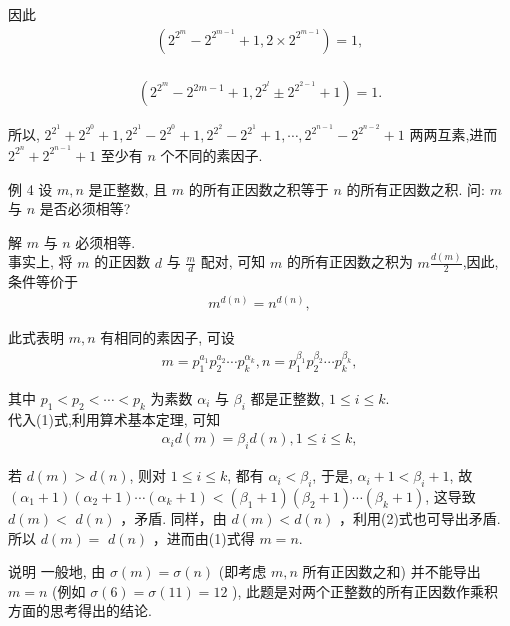 因此\\
\begin{align*}
\left(2^{2^{m}}-2^{2^{m-1}}+1,2 \times 2^{2^{m-1}}\right)=1,
\end{align*}\\
\begin{align*}
\left(2^{2^{m}}-2^{2 m-1}+1,2^{2^{l}} \pm 2^{2^{2-1}}+1\right)=1 .
\end{align*}

所以, $2^{2^{1}}+2^{2^{0}}+1,2^{2^{1}}-2^{2^{0}}+1,2^{2^{2}}-2^{2^{1}}+1, \cdots, 2^{2^{n-1}}-2^{2^{n-2}}+1$ 两两互素,进而 $2^{2^{n}}+2^{2^{n-1}}+1$ 至少有 $n$ 个不同的素因子. 

例 4 设 $m ,  n$ 是正整数, 且 $m$ 的所有正因数之积等于 $n$ 的所有正因数之积. 问: $m$ 与 $n$ 是否必须相等?

解 $m$ 与 $n$ 必须相等.\\
事实上, 将 $m$ 的正因数 $d$ 与 $\frac{m}{d}$ 配对, 可知 $m$ 的所有正因数之积为 $m \frac{d(m)}{2}$,因此, 条件等价于\\
\begin{align*}
m^{d(n)}=n^{d(n)},
\end{align*}

此式表明 $m ,  n$ 有相同的素因子, 可设\\
\begin{align*}
m=p_{1}^{a_{1}} p_{2}^{a_{2}} \cdots p_{k}^{\alpha_{k}}, n=p_{1}^{\beta_{1}} p_{2}^{\beta_{2}} \cdots p_{k}^{\beta_{k}},
\end{align*}

其中 $p_{1}<p_{2}<\cdots<p_{k}$ 为素数 $\alpha_{i}$ 与 $\beta_{i}$ 都是正整数, $1 \leqslant i \leqslant k$.\\
代入(1)式,利用算术基本定理, 可知\\
\begin{align*}
\alpha_{i} d(m)=\beta_{i} d(n), 1 \leqslant i \leqslant k,
\end{align*}

若 $d(m)>d(n)$, 则对 $1 \leqslant i \leqslant k$, 都有 $\alpha_{i}<\beta_{i}$, 于是, $\alpha_{i}+1<\beta_{i}+1$, 故 $\left(\alpha_{1}+1\right)\left(\alpha_{2}+1\right) \cdots\left(\alpha_{k}+1\right)<\left(\beta_{1}+1\right)\left(\beta_{2}+1\right) \cdots\left(\beta_{k}+1\right)$, 这导致 $d(m)<$ $d(n)$ ，矛盾. 同样，由 $d(m)<d(n)$ ，利用(2)式也可导出矛盾. 所以 $d(m)=$ $d(n)$ ，进而由(1)式得 $m=n$.

说明 一般地, 由 $\sigma(m)=\sigma(n)$ (即考虑 $m ,  n$ 所有正因数之和) 并不能导出 $m=n$ (例如 $\sigma(6)=\sigma(11)=12$ ), 此题是对两个正整数的所有正因数作乘积方面的思考得出的结论.

